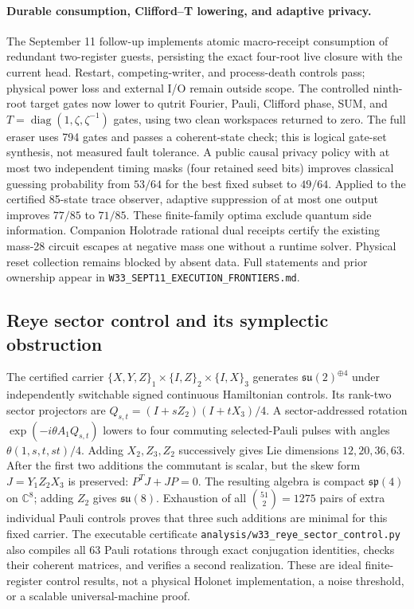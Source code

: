 \paragraph{Durable consumption, Clifford--T lowering, and adaptive privacy.}
The September 11 follow-up implements atomic macro-receipt consumption of
redundant two-register guests, persisting the exact four-root live closure with
the current head.  Restart, competing-writer, and process-death controls pass;
physical power loss and external I/O remain outside scope.
The controlled ninth-root target gates now lower to qutrit Fourier, Pauli,
Clifford phase, SUM, and $T=\operatorname{diag}(1,\zeta,\zeta^{-1})$ gates,
using two clean workspaces returned to zero.  The full eraser uses 794 gates
and passes a coherent-state check; this is logical gate-set synthesis, not
measured fault tolerance.
A public causal privacy policy with at most two independent timing masks
(four retained seed bits) improves classical guessing probability from
$53/64$ for the best fixed subset to $49/64$.  Applied to the certified
85-state trace observer, adaptive suppression of at most one output improves
$77/85$ to $71/85$.  These finite-family optima exclude quantum side
information.  Companion Holotrade rational dual receipts certify the existing
mass-28 circuit escapes at negative mass one without a runtime solver.
Physical reset collection remains blocked by absent data.  Full statements
and prior ownership appear in \texttt{W33\_SEPT11\_EXECUTION\_FRONTIERS.md}.

\subsection{Reye sector control and its symplectic obstruction}
The certified carrier
$\{X,Y,Z\}_1\times\{I,Z\}_2\times\{I,X\}_3$ generates
$\mathfrak{su}(2)^{\oplus4}$ under independently switchable signed
continuous Hamiltonian controls. Its rank-two sector projectors are
$Q_{s,t}=(I+sZ_2)(I+tX_3)/4$.
A sector-addressed rotation $\exp(-i\theta A_1Q_{s,t})$ lowers to four
commuting selected-Pauli pulses with angles
$\theta(1,s,t,st)/4$.
Adding $X_2,Z_3,Z_2$ successively gives Lie dimensions
$12,20,36,63$. After the first two additions the commutant is scalar,
but the skew form $J=Y_1Z_2X_3$ is preserved:
$P^TJ+JP=0$. The resulting algebra is compact $\mathfrak{sp}(4)$
on $\mathbb C^8$; adding $Z_2$ gives $\mathfrak{su}(8)$.
Exhaustion of all $\binom{51}{2}=1275$ pairs of extra individual Pauli
controls proves that three such additions are minimal for this fixed carrier.
The executable certificate \texttt{analysis/w33\_reye\_sector\_control.py}
also compiles all 63 Pauli rotations through exact conjugation identities,
checks their coherent matrices, and verifies a second realization.
These are ideal finite-register control results, not a physical Holonet
implementation, a noise threshold, or a scalable universal-machine proof.


